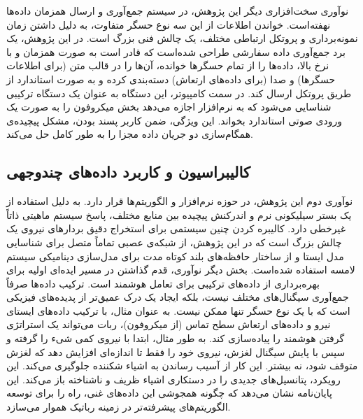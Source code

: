 نوآوری سخت‌افزاری دیگر این پژوهش، در سیستم جمع‌آوری و ارسال همزمان داده‌ها نهفته‌است. خواندن اطلاعات از این سه نوع حسگر متفاوت، به دلیل داشتن زمان نمونه‌برداری و پروتکل ارتباطی مختلف، یک چالش فنی بزرگ است. در این پژوهش، یک برد جمع‌آوری داده سفارشی طراحی شده‌است که قادر است به صورت همزمان و با نرخ بالا، داده‌ها را از تمام حسگرها خوانده، آن‌ها را در قالب متن (برای اطلاعات حسگر‌ها) و صدا (برای داده‌های ارتعاش) دسته‌بندی کرده و به صورت استاندارد از طریق پروتکل
ارسال کند. در سمت کامپیوتر، این دستگاه به عنوان یک دستگاه ترکیبی 
شناسایی می‌شود که به نرم‌افزار اجازه می‌دهد بخش میکروفون را به صورت یک ورودی صوتی استاندارد بخواند. این ویژگی، ضمن کاربر پسند بودن، مشکل پیچیده‌ی همگام‌سازی دو جریان داده مجزا را به طور کامل حل می‌کند.

\subsection{کالیبراسیون و کاربرد داده‌های چندوجهی}

نوآوری دوم این پژوهش، در حوزه نرم‌افزار و الگوریتم‌ها قرار دارد. به دلیل استفاده از یک بستر سیلیکونی نرم و اندرکنش پیچیده بین منابع مختلف، پاسخ سیستم ماهیتی ذاتاً غیرخطی دارد. کالیبره کردن چنین سیستمی برای استخراج دقیق بردارهای نیروی یک چالش بزرگ است که در این پژوهش، از شبکه‌ی عصبی تماماً متصل
 برای شناسایی مدل ایستا
  و از ساختار حافظه‌های بلند کوتاه مدت
   برای مدل‌سازی دینامیکی سیستم لامسه استفاده شده‌است.
بخش دیگر نوآوری، قدم گذاشتن در مسیر ایده‌ای اولیه برای بهره‌برداری از داده‌های ترکیبی برای تعامل هوشمند است. ترکیب داده‌ها صرفاً جمع‌آوری سیگنال‌های مختلف نیست، بلکه ایجاد یک درک عمیق‌تر از پدیده‌های فیزیکی است که با یک نوع حسگر تنها ممکن نیست. به عنوان مثال، با ترکیب داده‌های ایستای نیرو و داده‌های ارتعاش سطح تماس (از میکروفون)، ربات می‌تواند یک استراتژی گرفتن هوشمند را پیاده‌سازی کند. به طور مثال، ابتدا با نیروی کمی شیء را گرفته و سپس با پایش سیگنال لغزش، نیروی خود را فقط تا اندازه‌ای افزایش دهد که لغزش متوقف شود، نه بیشتر. این کار از آسیب رساندن به اشیاء شکننده جلوگیری می‌کند. این رویکرد، پتانسیل‌های جدیدی را در دستکاری اشیاء ظریف و ناشناخته باز می‌کند. این پایان‌نامه نشان می‌دهد که چگونه همجوشی این داده‌های غنی، راه را برای توسعه الگوریتم‌های پیشرفته‌تر در زمینه رباتیک هموار می‌سازد.

